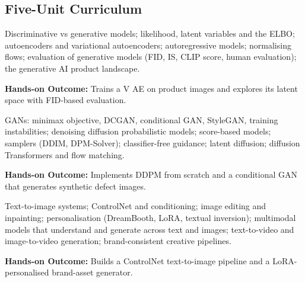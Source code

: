 \documentclass[10pt,a4paper]{article}
\begin{document}
\subsection*{Five-Unit Curriculum}
\begin{tcolorbox}[unitbox,title={{\color{gold}UNIT I}\quad Foundations of Generative Modelling\hfill{\color{gold}9 Hours}}]\small Discriminative vs generative models; likelihood, latent variables and the ELBO; autoencoders and variational autoencoders; autoregressive models; normalising flows; evaluation of generative models (FID, IS, CLIP score, human evaluation); the generative AI product landscape.\par\vspace{2pt}\par\textbf{Hands-on Outcome:} Trains a V AE on product images and explores its latent space with FID-based evaluation.\end{tcolorbox}
\begin{tcolorbox}[unitbox,title={{\color{gold}UNIT II}\quad Adversarial and Diffusion Models\hfill{\color{gold}9 Hours}}]\small GANs: minimax objective, DCGAN, conditional GAN, StyleGAN, training instabilities; denoising diffusion probabilistic models; score-based models; samplers (DDIM, DPM-Solver); classifier-free guidance; latent diffusion; diffusion Transformers and flow matching.\par\vspace{2pt}\par\textbf{Hands-on Outcome:} Implements DDPM from scratch and a conditional GAN that generates synthetic defect images.\end{tcolorbox}
\begin{tcolorbox}[unitbox,title={{\color{gold}UNIT III}\quad Controllable Image and Multimodal Generation\hfill{\color{gold}9 Hours}}]\small Text-to-image systems; ControlNet and conditioning; image editing and inpainting; personalisation (DreamBooth, LoRA, textual inversion); multimodal models that understand and generate across text and images; text-to-video and image-to-video generation; brand-consistent creative pipelines.\par\vspace{2pt}\par\textbf{Hands-on Outcome:} Builds a ControlNet text-to-image pipeline and a LoRA-personalised brand-asset generator.\end{tcolorbox}
\end{document}
